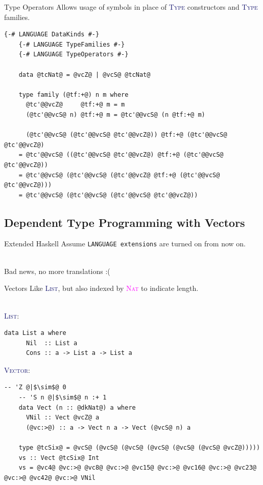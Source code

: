 \documentclass[xcolor={usenames,dvipsnames}]{beamer}
\newcommand{\htycon}[1]{\textcolor{MidnightBlue}{\textsc{#1}}}
\newcommand{\hkind}[1]{\textcolor{Fuchsia}{\textsc{#1}}}
\begin{document}
\begin{frame}[fragile]{Type Operators}
  Allows usage of symbols in place of \htycon{Type} constructors and \htycon{Type} families.

  \begin{lstlisting}[style=hask]
    {-# LANGUAGE DataKinds #-}
    {-# LANGUAGE TypeFamilies #-}
    {-# LANGUAGE TypeOperators #-}

    data @tcNat@ = @vcZ@ | @vcS@ @tcNat@

    type family (@tf:+@) n m where
      @tc'@@vcZ@     @tf:+@ m = m
      (@tc'@@vcS@ n) @tf:+@ m = @tc'@@vcS@ (n @tf:+@ m)

      (@tc'@@vcS@ (@tc'@@vcS@ @tc'@@vcZ@)) @tf:+@ (@tc'@@vcS@ @tc'@@vcZ@)
    = @tc'@@vcS@ ((@tc'@@vcS@ @tc'@@vcZ@) @tf:+@ (@tc'@@vcS@ @tc'@@vcZ@))
    = @tc'@@vcS@ (@tc'@@vcS@ (@tc'@@vcZ@ @tf:+@ (@tc'@@vcS@ @tc'@@vcZ@)))
    = @tc'@@vcS@ (@tc'@@vcS@ (@tc'@@vcS@ @tc'@@vcZ@))
  \end{lstlisting}
\end{frame}


\subsection{Dependent Type Programming with Vectors}

\begin{frame}[fragile]{Extended Haskell}
  Assume \texttt{LANGUAGE extensions} are turned on from now on.

  \ \\
  Bad news, no more translations :(
\end{frame}

\begin{frame}[fragile]{Vectors}
  Like \htycon{List}, but also indexed by \hkind{Nat} to indicate length.

  \ \\
  \htycon{List}:
  \begin{lstlisting}[style=hask]
    data List a where
      Nil  :: List a
      Cons :: a -> List a -> List a
  \end{lstlisting}

  \htycon{Vector}:
  \begin{lstlisting}[style=hask]
    -- 'Z @|$\sim$@ 0
    -- 'S n @|$\sim$@ n :+ 1
    data Vect (n :: @dkNat@) a where
      VNil :: Vect @vcZ@ a
      (@vc:>@) :: a -> Vect n a -> Vect (@vcS@ n) a

    type @tcSix@ = @vcS@ (@vcS@ (@vcS@ (@vcS@ (@vcS@ (@vcS@ @vcZ@)))))
    vs :: Vect @tcSix@ Int
    vs = @vc4@ @vc:>@ @vc8@ @vc:>@ @vc15@ @vc:>@ @vc16@ @vc:>@ @vc23@ @vc:>@ @vc42@ @vc:>@ VNil
  \end{lstlisting}
\end{frame}
\end{document}

